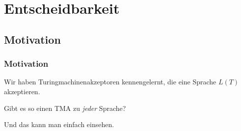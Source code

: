 \section{Entscheidbarkeit}
\subsection{Motivation}
\begin{frame}
  \frametitle{Motivation}
  Wir haben Turingmachinenakzeptoren kennengelernt, die eine Sprache $L(T)$ akzeptieren.
  \begin{alertblock}{}
    Gibt es so einen TMA zu \emph{jeder} Sprache?
    \begin{center}  \end{center}
  \end{alertblock}
  Und das kann man einfach einsehen.
\end{frame}
